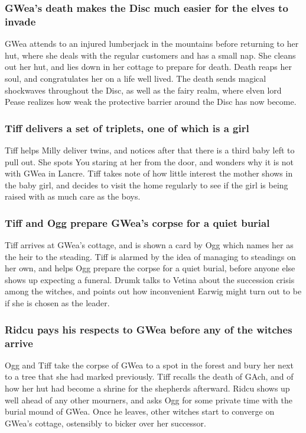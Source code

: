 \subsubsection{\Gls{GWea}'s death makes the Disc much easier for the elves to invade}
\Gls{GWea} attends to an injured lumberjack in the mountains before returning to her hut, where she
deals with the regular customers and has a small nap. She cleans out her hut, and lies down in
her cottage to prepare for death. \Gls{Death} reaps her soul, and congratulates her on a life
well lived. The death sends magical shockwaves throughout the Disc, as well as the fairy realm,
where elven lord \Gls{Pease} realizes how weak the protective barrier around the Disc has now
become.

\subsubsection{\Gls{Tiff} delivers a set of triplets, one of which is a girl}
\Gls{Tiff} helps \Gls{Milly} deliver twins, and notices after that there is a third baby left to
pull out. She spots \Gls{You} staring at her from the door, and wonders why it is not with
\Gls{GWea} in Lancre. \Gls{Tiff} takes note of how little interest the mother shows in the baby
girl, and decides to visit the home regularly to see if the girl is being raised with as much care
as the boys.

\subsubsection{\Gls{Tiff} and \Gls{Ogg} prepare \Gls{GWea}'s corpse for a quiet burial}
\Gls{Tiff} arrives at \Gls{GWea}'s cottage, and is shown a card by \Gls{Ogg} which names her as
the heir to the steading. \Gls{Tiff} is alarmed by the idea of managing to steadings on her own,
and helps \Gls{Ogg} prepare the corpse for a quiet burial, before anyone else shows up expecting
a funeral. \Gls{Drumk} talks to \Gls{Vetina} about the succession crisis among the witches, and
points out how inconvenient \Gls{Earwig} might turn out to be if she is chosen as the leader.

\subsubsection{\Gls{Ridcu} pays his respects to \Gls{GWea} before any of the witches arrive}
\Gls{Ogg} and \Gls{Tiff} take the corpse of \Gls{GWea} to a spot in the forest and bury her next to
a tree that she had marked previously. \Gls{Tiff} recalls the death of \Gls{GAch}, and of how her
hut had become a shrine for the shepherds afterward. \Gls{Ridcu} shows up well ahead of any other
mourners, and asks \Gls{Ogg} for some private time with the burial mound of \Gls{GWea}. Once he
leaves, other witches start to converge on \Gls{GWea}'s cottage, ostensibly to bicker over her
successor.

